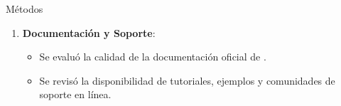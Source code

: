 \begin{block}{Métodos}
\begin{enumerate}
        \item \textbf{Documentación y Soporte}:
              \begin{itemize}
                  \item Se evaluó la calidad de la documentación oficial de .
                  \item Se revisó la disponibilidad de tutoriales, ejemplos y comunidades de soporte en línea.
              \end{itemize}
    \end{enumerate}

\end{block}
